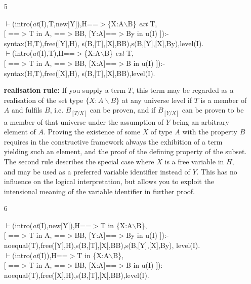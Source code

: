 \documentclass[11pt]{report}
\begin{document}
 \begin{enumerate}
 \item[5]
\begin{sf}\begin{tabbing}
$\vdash$(intro(\mbox{\it at}(I),T,new[Y]),H==$>$\{X:A$\backslash$B\} \mbox{\it ext} T, \\[-0.15ex]
\hspace{2em}[ ==$>$T in A, ==$>$BB, [Y:A]==$>$By in u(I) ]):-\\[-0.15ex]
\hspace{2em}syntax(H,T),free([Y],H), s(B,[T],[X],BB),s(B,[Y],[X],By),level(I).\\[-0.15ex]
$\vdash$(intro(\mbox{\it at}(I),T),H==$>$\{X:A$\backslash$B\} \mbox{\it ext} T,\\[-0.15ex]
\hspace{2em}[ ==$>$T in A, ==$>$BB, [X:A]==$>$B in u(I) ]):-\\[-0.15ex]
\hspace{2em}syntax(H,T),free([X],H), s(B,[T],[X],BB),level(I).
\end{tabbing}\end{sf}

 {\bf realisation rule:}
 If you supply a term $T$, this term may be regarded
 as a realisation of the set type $\{X:A\backslash B\}$ at any
 universe level
 if $T$ is a member of $A$ and fulfils $B$,
 i.e. $B_{[T/X]}$ can be proven,
 and if $B_{[Y/X]}$ can be proven to be a member of that universe
 under the assumption of $Y$ being an arbitrary element of $A$.
 Proving the existence of some $X$ of type $A$ with the property $B$
 requires in the constructive framework always the exhibition
 of a term
 yielding such an element, and the proof of the defining
 property of the subset.
 The second rule describes the special case
 where $X$ is a free variable in $H$, and may be used as a
 preferred variable identifier instead of $Y$. This has no 
 influence on the logical interpretation, but allows you to
 exploit the intensional meaning of the variable identifier
 in further proof.
  
 \item[6]
\begin{sf}\begin{tabbing}
$\vdash$(intro(\mbox{\it at}(I),new[Y]),H==$>$T in \{X:A$\backslash$B\},\\[-0.15ex]
\hspace{2em}[ ==$>$T in A, ==$>$BB, [Y:A]==$>$By in u(I) ]):-\\[-0.15ex]
\hspace{2em}noequal(T),free([Y],H),s(B,[T],[X],BB),s(B,[Y],[X],By), level(I).\\[-0.15ex]
$\vdash$(intro(\mbox{\it at}(I)),H==$>$T in \{X:A$\backslash$B\},\\[-0.15ex]
\hspace{2em}[ ==$>$T in A, ==$>$BB, [X:A]==$>$B in u(I) ]):-\\[-0.15ex]
\hspace{2em}noequal(T),free([X],H),s(B,[T],[X],BB),level(I).
\end{tabbing}\end{sf}


\end{enumerate}
\end{document}
